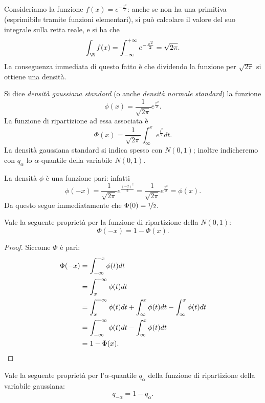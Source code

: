 Consideriamo la funzione $f(x) = e^{-\frac{x^2}{2}}$: anche se non ha una primitiva (esprimibile tramite funzioni elementari), si può calcolare il valore del suo integrale sulla retta reale, e si ha che \[
    \int_\R f(x) = \int_{-\infty}^{+\infty} e^{-\frac{x^2}{2}} = \sqrt{2\pi}.    
\] La conseguenza immediata di questo fatto è che dividendo la funzione per $\sqrt{2\pi}$ si ottiene una densità.

\begin{definition}
     Si dice \emph{densità gaussiana standard} (o anche \emph{densità normale standard}) la funzione \[
        \phi(x) = \frac{1}{\sqrt{2\pi}}e^{\frac{x^2}{2}}.    
    \] La funzione di ripartizione ad essa associata è \[
        \Phi(x) = \frac{1}{\sqrt{2\pi}}\int_{\infty}^x e^{\frac{t^2}{2}}dt.
    \] La densità gaussiana standard si indica spesso con $N(0, 1)$; inoltre indicheremo con $q_\alpha$ lo $\alpha$-quantile della variabile $N(0, 1)$.
\end{definition}

\begin{remark}
    La densità $\phi$ è una funzione pari: infatti \[
        \phi(-x) = \frac{1}{\sqrt{2\pi}}e^{\frac{(-x)^2}{2}} =  \frac{1}{\sqrt{2\pi}}e^{\frac{x^2}{2}} = \phi(x).
    \] Da questo segue immediatamente che $\Phi(0) = \nicefrac{1}{2}$.
\end{remark}

\begin{proposition}
    Vale la seguente proprietà per la funzione di ripartizione della $N(0, 1)$: \[
        \Phi(-x) = 1 - \Phi(x).    
    \]
\end{proposition}
\begin{proof} Siccome $\Phi$ è pari:
    \begin{align*}
        \Phi(-x) &= \int_{-\infty}^{-x} \phi(t)dt \\
        &= \int_x^{+\infty} \phi(t)dt \\
        &= \int_x^{+\infty} \phi(t)dt + \int_{\infty}^{x} \phi(t)dt - \int_{\infty}^{x} \phi(t)dt\\
        &= \int_{-\infty}^{+\infty} \phi(t)dt - \int_{\infty}^{x} \phi(t)dt\\
        &= 1 - \Phi(x). \qedhere
    \end{align*}
\end{proof}
\begin{proposition}
    Vale la seguente proprietà per l'$\alpha$-quantile $q_\alpha$ della funzione di ripartizione della variabile gaussiana: \[
        q_{-\alpha} = 1 - q_{\alpha}.
    \]
\end{proposition}

